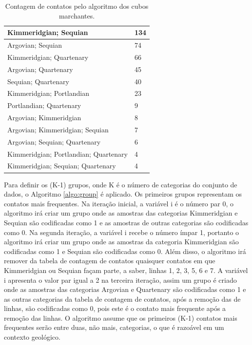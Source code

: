 \begin{table}[H]
\caption{Contagem de contatos pelo algoritmo dos cubos marchantes.} \label{table:contact_count}
\centering
\begin{tabular}{|l|l|}
\hline
Kimmeridgian; Sequian                 & 134 \\ \hline
Argovian; Sequian                     & 74  \\ \hline
Kimmeridgian; Quartenary              & 66  \\ \hline
Argovian; Quartenary                  & 45  \\ \hline
Sequian; Quartenary                   & 40  \\ \hline
Kimmeridgian; Portlandian             & 23  \\ \hline
Portlandian; Quartenary               & 9   \\ \hline
Argovian; Kimmeridgian                & 8   \\ \hline
Argovian; Kimmeridgian; Sequian       & 7   \\ \hline
Argovian; Sequian; Quartenary         & 6   \\ \hline
Kimmeridgian; Portlandian; Quartenary & 4   \\ \hline
Kimmeridgian; Sequian; Quartenary     & 4   \\ \hline
\end{tabular}
\end{table}

Para definir os (K-1) grupos, onde K é o número de categorias do conjunto de dados, o Algoritmo \ref{algo:group} é aplicado. Os primeiros grupos representam os contatos mais frequentes. Na iteração inicial, a variável i é o número par 0, o algoritmo irá criar um grupo onde as amostras das categorias Kimmeridgian e Sequian são codificadas como 1 e as amostras de outras categorias são codificadas como 0. Na segunda iteração, a variável i recebe o número ímpar 1, portanto o algoritmo irá criar um grupo onde as amostras da categoria Kimmeridgian são codificadas como 1 e Sequian são codificadas como 0. Além disso, o algoritmo irá remover da tabela de contagem de contatos quaisquer contatos em que Kimmeridgian ou Sequian façam parte, a saber, linhas 1, 2, 3, 5, 6 e 7. A variável i apresenta o valor par igual a 2 na terceira iteração, assim um grupo é criado onde as amostras das categorias Argovian e Quartenary são codificadas como 1 e as outras categorias da tabela de contagem de contatos, após a remoção das de linhas, são codificadas como 0, pois este é o contato mais frequente após a remoção das linhas. O algoritmo assume que os primeiros (K-1) contatos mais frequentes serão entre duas, não mais, categorias, o que é razoável em um contexto geológico.

